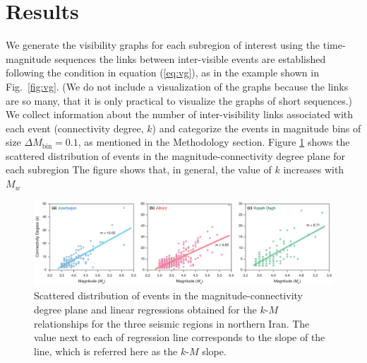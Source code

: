 
\section{Results}

We generate the visibility graphs for each subregion of interest using the time-magnitude sequences  the links between inter-visible events are established following the condition in equation (\ref{eq:vg}), as in the example shown in Fig.~\ref{fig:vg}. (We do not include a visualization of the graphs because the links are so many, that it is only practical to visualize the graphs of short sequences.) We collect information about the number of inter-visibility links associated with each event (connectivity degree, $k$) and categorize the events in magnitude bins of size $\Delta M_{\mathrm{bin}} = 0.1$, as mentioned in the Methodology section. Figure \ref{fig:km} shows the scattered distribution of events in the magnitude-connectivity degree plane for each subregion The figure shows that, in general, the value of $k$ increases with $M_w$

\begin{figure}[t]
	\centering
	\includegraphics[width=\textwidth]{figures/pdf/figure-06} 
	\caption{Scattered distribution of events in the magnitude-connectivity degree plane and linear regressions obtained for the $k$-$M$ relationships for the three seismic regions in northern Iran. The value next to each of regression line corresponds to the slope of the line, which is referred here as the $k$-$M$ slope.}
	\label{fig:km}
\end{figure}

